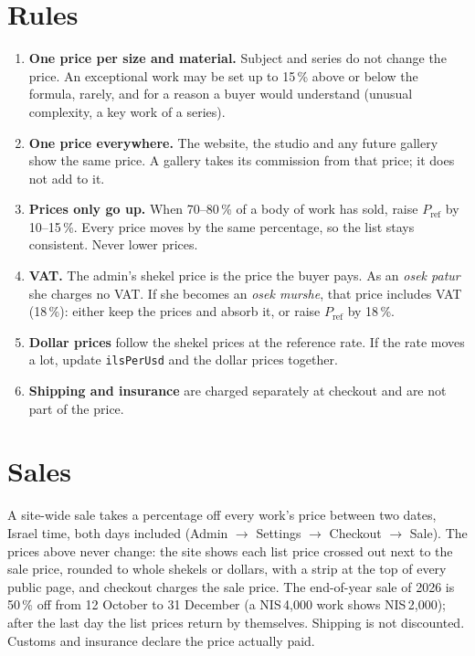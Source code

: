 \documentclass[11pt,a4paper]{article}
\newcommand{\nis}[1]{NIS\,#1}
\newcommand{\code}[1]{\nolinkurl{#1}}  %
\newcommand{\Pref}{P_{\mathrm{ref}}}
\begin{document}
\section{Rules}
\begin{enumerate}
  \item \textbf{One price per size and material.} Subject and series do not change the price. An
    exceptional work may be set up to 15\,\% above or below the formula, rarely, and for a reason a
    buyer would understand (unusual complexity, a key work of a series).
  \item \textbf{One price everywhere.} The website, the studio and any future gallery show the same
    price. A gallery takes its commission from that price; it does not add to it.
  \item \textbf{Prices only go up.} When 70--80\,\% of a body of work has sold, raise $\Pref$ by
    10--15\,\%. Every price moves by the same percentage, so the list stays consistent. Never lower
    prices.
  \item \textbf{VAT.} The admin's shekel price is the price the buyer pays. As an \emph{osek patur}
    she charges no VAT. If she becomes an \emph{osek murshe}, that price includes VAT (18\,\%):
    either keep the prices and absorb it, or raise $\Pref$ by 18\,\%.
  \item \textbf{Dollar prices} follow the shekel prices at the reference rate. If the rate moves a
    lot, update \code{ilsPerUsd} and the dollar prices together.
  \item \textbf{Shipping and insurance} are charged separately at checkout and are not part of the
    price.
\end{enumerate}

\section{Sales}
A site-wide sale takes a percentage off every work's price between two dates, Israel time, both
days included (Admin $\to$ Settings $\to$ Checkout $\to$ Sale). The prices above never change:
the site shows each list price crossed out next to the sale price, rounded to whole shekels or
dollars, with a strip at the top of every public page, and checkout charges the sale price. The
end-of-year sale of 2026 is 50\,\% off from 12 October to 31 December (a \nis{4{,}000} work
shows \nis{2{,}000}); after the last day the list prices return by themselves. Shipping is not
discounted. Customs and insurance declare the price actually paid.
\end{document}
